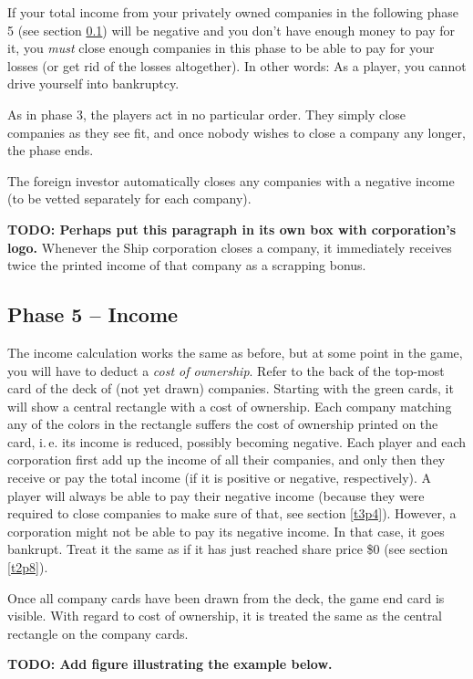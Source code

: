 \documentclass[10pt,final]{report}
\begin{document}
\begin{multicols}{2}
If your total income from your privately owned companies in the
following phase 5 (see section \ref{t3p5}) will be negative and you
don't have enough money to pay for it, you \emph{must} close enough
companies in this phase to be able to pay for your losses (or get rid
of the losses altogether). In other words: As a player, you cannot
drive yourself into bankruptcy.

As in phase 3, the players act in no particular order. They simply
close companies as they see fit, and once nobody wishes to close a
company any longer, the phase ends.

The foreign investor automatically closes any companies with a
negative income (to be vetted separately for each company).

\textbf{TODO: Perhaps put this paragraph in its own box with
  corporation's logo.} Whenever the Ship corporation closes a company,
it immediately receives twice the printed income of that company as a
scrapping bonus.

\subsection{Phase 5 -- Income}
\label{t3p5}

The income calculation works the same as before, but at some point in
the game, you will have to deduct a \emph{cost of ownership}. Refer to
the back of the top-most card of the deck of (not yet drawn)
companies. Starting with the green cards, it will show a central
rectangle with a cost of ownership. Each company matching any of the
colors in the rectangle suffers the cost of ownership printed on the
card, i.\,e. its income is reduced, possibly becoming negative. Each
player and each corporation first add up the income of all their
companies, and only then they receive or pay the total income (if it
is positive or negative, respectively). A player will always be able
to pay their negative income (because they were required to close
companies to make sure of that, see section \ref{t3p4}). However, a
corporation might not be able to pay its negative income. In that
case, it goes bankrupt. Treat it the same as if it has just reached
share price \$0 (see section \ref{t2p8}).

Once all company cards have been drawn from the deck, the game end
card is visible. With regard to cost of ownership, it is treated the
same as the central rectangle on the company cards.

\textbf{TODO: Add figure illustrating the example below.}


\end{multicols}
\end{document}
